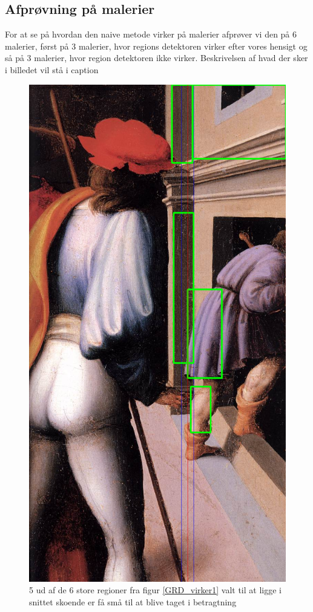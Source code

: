 \subsection{Afprøvning på malerier}
For at se på hvordan den naive metode virker på malerier afprøver vi den
på 6 malerier, først på 3 malerier, hvor regions detektoren virker
efter vores hensigt og så på 3 malerier, hvor region detektoren ikke
virker. Beskrivelsen af hvad der sker i billedet vil stå i caption


\begin{figure}[h!!]
	\begin{center}
		\includegraphics[scale=0.3,angle=0]{afsnit/afprovning/billeder/naive_losning/naiv_kfarver_sdetaljer.png}
	\end{center}
	\caption[]{5 ud af de 6 store regioner fra figur \ref{GRD_virker1} valt til at ligge i snittet skoende er få små til at blive taget i betragtning}
	\label{naiv_kfarver_sdetaljer}
\end{figure}

